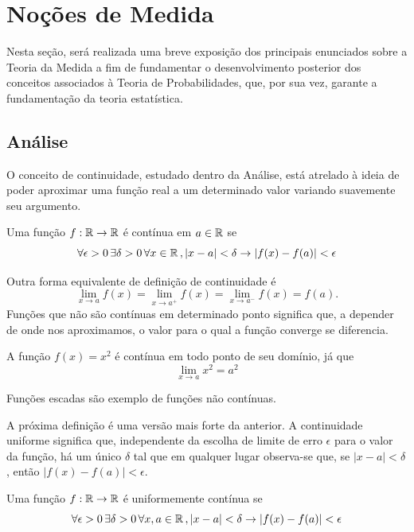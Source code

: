 \section{Noções de Medida}

Nesta seção, será realizada uma breve exposição dos principais enunciados sobre a Teoria
da Medida a fim de fundamentar o desenvolvimento posterior dos conceitos associados à
Teoria de Probabilidades, que, por sua vez, garante a fundamentação da teoria estatística.

\subsection{Análise}

O conceito de continuidade, estudado dentro da Análise, está atrelado à ideia de
poder aproximar uma função real a um determinado valor variando suavemente seu
argumento.

\begin{def:pontualmente continua}
Uma função $f: \mathbb{R} \to \mathbb{R}$ é contínua em $a \in \mathbb{R}$ se
\[
	\forall \epsilon > 0\, \exists \delta > 0\, \forall x \in \mathbb{R}\,,
	| x - a | < \delta \rightarrow | f(x) - f(a) | < \epsilon
\]
\end{def:pontualmente continua}

Outra forma equivalente de definição de continuidade é
\[
	\lim_{x \to a} f(x) = \lim_{x \to a^+} f(x) = \lim_{x \to a^-} f(x) = f(a).
\]
Funções que não são contínuas em determinado ponto significa que, a depender de onde nos
aproximamos, o valor para o qual a função converge se diferencia.

\begin{exp:pontualmente contínua}
A função $f(x) = x^2$ é contínua em todo ponto de seu domínio, já que
\[
	\lim_{x \to a} x^2 = a^2
\]
\end{exp:pontualmente contínua}

\begin{exp:pontualmente contínua neg}
Funções escadas são exemplo de funções não contínuas.
\end{exp:pontualmente contínua neg}

A próxima definição é uma versão mais forte da anterior.
A continuidade uniforme significa que, independente da escolha de limite de erro $\epsilon$
para o valor da função, há um único $\delta$ tal que em qualquer lugar observa-se que,
se $|x - a| < \delta$, então $|f(x) - f(a)| < \epsilon$.

\begin{def:uniformemente continua}
Uma função $f: \mathbb{R} \to \mathbb{R}$ é uniformemente contínua se
\[
	\forall \epsilon > 0\, \exists \delta > 0\, \forall x,a \in \mathbb{R}\,,
	| x - a | < \delta \rightarrow | f(x) - f(a) | < \epsilon
\]
\end{def:uniformemente continua}


